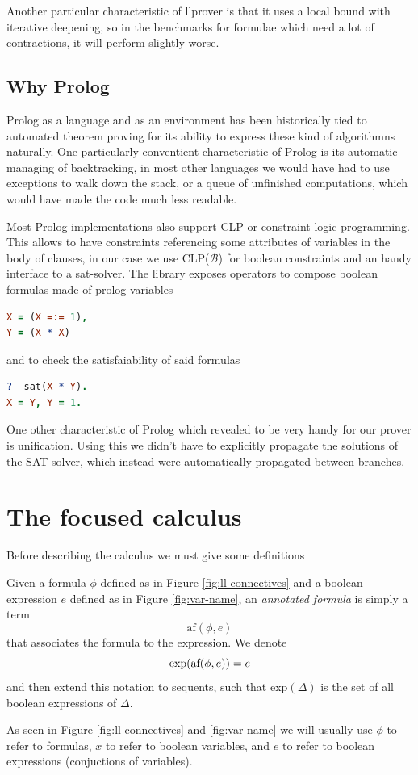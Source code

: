 \documentclass[a4paper, 12pt, tesi, english]{report}
\begin{document}
Another particular characteristic of llprover is that it uses a local bound with iterative deepening, so in the benchmarks for formulae which need a lot of contractions, it will perform slightly worse.

\section{Why Prolog}
Prolog as a language and as an environment has been historically tied to automated theorem proving for its ability to express these kind of algorithmns naturally.
One particularly conventient characteristic of Prolog is its automatic managing of backtracking, in most other languages we would have had to use exceptions to walk down the stack, or a queue of unfinished computations, which would have made the code much less readable.

Most Prolog implementations also support CLP or constraint logic programming.
This allows to have constraints referencing some attributes of variables in the body of clauses, in our case we use CLP($\mathcal{B}$) for boolean constraints and an handy interface to a sat-solver.
The library exposes operators to compose boolean formulas made of prolog variables
\begin{lstlisting}[language=prolog, numbers=none]
X = (X =:= 1),
Y = (X * X)
\end{lstlisting}
and to check the satisfaiability of said formulas
\begin{lstlisting}[language=prolog, numbers=none]
?- sat(X * Y).
X = Y, Y = 1.
\end{lstlisting}

One other characteristic of Prolog which revealed to be very handy for our prover is unification.
Using this we didn't have to explicitly propagate the solutions of the SAT-solver, which instead were automatically propagated between branches.

\chapter{The focused calculus}
Before describing the calculus we must give some definitions


\begin{define}
	\label{def:annotated}
	Given a formula $\phi$ defined as in Figure \ref{fig:ll-connectives} and a boolean expression
	$e$ defined as in Figure \ref{fig:var-name}, an \textit{annotated formula} is simply a term 
	$$ \text{af}(\phi, e) $$
	that associates the formula to the expression.
	We denote 
	$$ \text{exp}(\text{af}(\phi, e)) = e $$
	and then extend this notation to sequents, such that $ \text{exp}(\Delta) $ is the set of all boolean expressions of $\Delta$.
\end{define}
As seen in Figure \ref{fig:ll-connectives} and \ref{fig:var-name} we will usually use $\phi$ to refer to formulas, $x$ to refer to boolean variables, and $e$ to refer to boolean expressions (conjuctions of variables).
\end{document}
